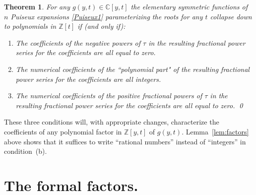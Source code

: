 \documentclass{article}
\theoremstyle{plain}
\newtheorem{thm}{Theorem}
\theoremstyle{definition}
\newcommand{\hideqed}{\renewcommand{\qed}{}} %
\newcommand{\Cee}{\mathbb{C}}   %
\newcommand{\Zed}{\mathbb{Z}}   %
\begin{document}

\begin{thm} %
\label{thm:nub}
For any $g(y,t) \in \Cee[y,t]$ the elementary symmetric functions of
$n$ Puiseux expansions \eqref{Puiseux1} parameterizing the roots for any $t$ collapse down to polynomials
in $\Zed[t]$ if (and only if):
\begin{enumerate}
\item %
The coefficients of 
the \emph{negative} powers of $\tau$ in the
resulting fractional power series for the coefficients are
\emph{all equal to zero}.
\item %
\label{polypart}
The numerical coefficients of the \emph{``polynomial part"} of the
resulting fractional power series for the coefficients
\emph{are all integers}.
\item %
The numerical coefficients of the\emph{ positive 
fractional powers} of $\tau$ in the resulting fractional power series
for the coefficients are \emph{all equal to zero}.
\qed
\end{enumerate}
\hideqed
\end{thm}



\noindent These three conditions will, with appropriate changes, characterize
the coefficients of any polynomial factor in $\Zed[y,t]$ of $g(y,t)$.
Lemma~\ref{lem:factors} above shows that it suffices to write ``rational
numbers'' instead of ``integers'' in condition~(b).



\section{The formal factors.}
\label{sec:factors}

\end{document}
